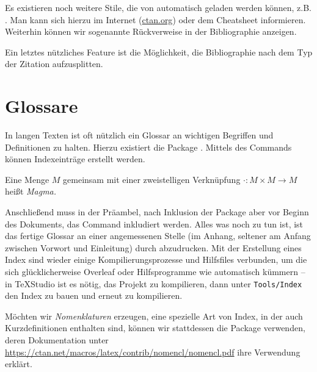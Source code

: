 Es existieren noch weitere Stile, die von  automatisch geladen werden können, z.B. .
Man kann sich hierzu im Internet (\url{ctan.org}) oder dem Cheatsheet informieren.
Weiterhin können wir sogenannte Rückverweise in der Bibliographie anzeigen.
\begin{latexlisting}
	\usepackage[backref=true]{biblatex}
\end{latexlisting}
Ein letztes nützliches Feature ist die Möglichkeit, die Bibliographie nach dem Typ der Zitation aufzusplitten.
\begin{latexlisting}
	\printbibliography[title={Bücher}, type=book]
	\printbibliography[title={Andere Quellen}, nottype=book]
\end{latexlisting}

\section{Glossare}
In langen Texten ist oft nützlich ein Glossar an wichtigen Begriffen und Definitionen zu halten.
Hierzu existiert die Package .
Mittels des Commands  können Indexeinträge erstellt werden.
\begin{latexlisting}
	\begin{definition}[Magma]\label{def:magma}
		Eine Menge $M$ gemeinsam mit einer zweistelligen Verknüpfung $\cdot: M \times M \to M$ heißt \emph{Magma.}
	\end{definition}
\end{latexlisting}
Anschließend muss in der Präambel, nach Inklusion der Package aber vor Beginn des Dokuments, das Command  inkludiert werden.
Alles was noch zu tun ist, ist das fertige Glossar an einer angemessenen Stelle (im Anhang, seltener am Anfang zwischen Vorwort und Einleitung) durch  abzudrucken.
Mit der Erstellung eines Index sind wieder einige Kompilierungsprozesse und Hilfsfiles verbunden, um die sich glücklicherweise Overleaf oder Hilfsprogramme wie  automatisch kümmern -- in TeXStudio ist es nötig, das Projekt zu kompilieren, dann unter \texttt{Tools/Index} den Index zu bauen und erneut zu kompilieren.

Möchten wir \emph{Nomenklaturen} erzeugen, eine spezielle Art von Index, in der auch Kurzdefinitionen enthalten sind, können wir stattdessen die Package  verwenden, deren Dokumentation unter \url{https://ctan.net/macros/latex/contrib/nomencl/nomencl.pdf} ihre Verwendung erklärt.

